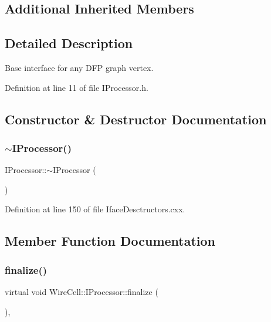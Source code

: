 \subsection*{Additional Inherited Members}


\subsection{Detailed Description}
Base interface for any D\+FP graph vertex. 

Definition at line 11 of file I\+Processor.\+h.



\subsection{Constructor \& Destructor Documentation}
\mbox{\label{class_wire_cell_1_1_i_processor_a424d24be30cc6836936d24dc29070fb4}} 
\subsubsection{\texorpdfstring{$\sim$\+I\+Processor()}{~IProcessor()}}
{\footnotesize\ttfamily I\+Processor\+::$\sim$\+I\+Processor (\begin{DoxyParamCaption}{ }\end{DoxyParamCaption})\hspace{0.3cm}{\ttfamily [virtual]}}



Definition at line 150 of file Iface\+Desctructors.\+cxx.



\subsection{Member Function Documentation}
\mbox{\label{class_wire_cell_1_1_i_processor_a0b2f1e45a2b8e7be61f3d4a47a6d8b82}} 
\subsubsection{\texorpdfstring{finalize()}{finalize()}}
{\footnotesize\ttfamily virtual void Wire\+Cell\+::\+I\+Processor\+::finalize (\begin{DoxyParamCaption}{ }\end{DoxyParamCaption})\hspace{0.3cm}{\ttfamily [inline]}, {\ttfamily [virtual]}}



